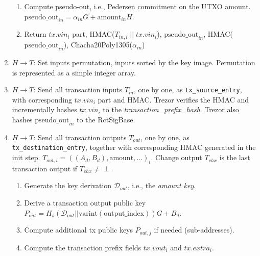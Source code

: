 \documentclass[]{article}
\begin{document}
\begin{enumerate}
\begin{enumerate}
		\item Compute pseudo-out, i.e., Pedersen commitment on the UTXO amount. $ \text{pseudo\_out}_{in} = \alpha_{in} G + \text{amount}_{in} H$.
		
		\item Return $tx.vin_i$ part, HMAC($T_{in,i} \; || \; tx.vin_i$), $\text{pseudo\_out}_{in}$, HMAC($\text{pseudo\_out}_{in}$), Chacha20Poly1305($\alpha_{in}$)
	\end{enumerate} 

	\item $H \rightarrow T$: Set inputs permutation, inputs sorted by the key image. Permutation is represented as a simple integer array.
	
	\item $H \rightarrow T$: Send all transaction inputs $T_{in}$, one by one, as \verb|tx_source_entry|, with corresponding $tx.vin_i$ part and HMAC. Trezor verifies the HMAC and incrementally hashes $tx.vin_i$ to the \emph{transaction\_prefix\_hash}. Trezor also hashes $\text{pseudo\_out}_{in}$ to the RctSigBase.
	
	\item $H \rightarrow T$: Send all transaction outputs $T_{out}$, one by one, as \verb|tx_destination_entry|, together with corresponding HMAC generated in the init step. $T_{out,i} = ((A_d, B_d), \text{amount}, \dots)_i$. Change output $T_{chx}$ is the last transaction output if $T_{chx} \neq \perp$.
	\begin{enumerate}			
		\item Generate the key derivation $\mathcal{D}_{out}$, i.e., the \emph{amount key}.
		
		\item Derive a transaction output public key $P_{out} = H_s(\mathcal{D}_{out} || \text{varint}(\text{output\_index}))G + B_d$.
		
		\item Compute additional tx public keys $P_{out,j}$ if needed (sub-addresses).
		
        \item Compute the transaction prefix fields $tx.vout_i$ and $tx.extra_i$.
        

\end{enumerate}
\end{enumerate}
\end{document}
